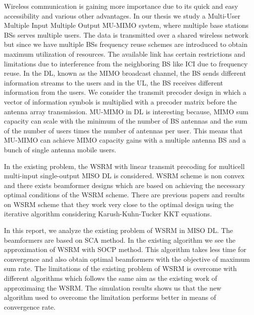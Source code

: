 Wireless communication is gaining more importance due to its quick and easy accessibility and various other advantages. In our thesis we study a Multi-User Multiple Input Multiple Output \ac{MU-MIMO} system, where multiple base stations \ac{BS}s serves multiple users. The data is transmitted over a shared wireless network but since we have multiple \ac{BS}s frequency reuse schemes are introduced to obtain maximum utilization of resources. The available link has certain restrictions and limitations due to interference from the neighboring \ac{BS} like \ac{ICI} due to frequency reuse. In the \ac{DL}, known as the \ac{MIMO} broadcast channel, the \ac{BS} sends different information streams to the users and in the \ac{UL}, the \ac{BS} receives different information from the users. We consider the transmit precoder design in which a vector of information symbols is multiplied with a precoder matrix before the antenna array transmission. \ac{MU-MIMO} in \ac{DL} is interesting because, \ac{MIMO} sum capacity can scale with the minimum of the number of \ac{BS} antennas and the sum of the number of users times the number of antennas per user. This means that \ac{MU-MIMO} can achieve \ac{MIMO} capacity gains with a multiple antenna \ac{BS} and a bunch of single antenna mobile users.

In the existing problem, the \ac{WSRM} with linear transmit precoding for multicell multi-input single-output \ac{MISO} \ac{DL} is considered. \ac{WSRM} scheme is non convex and there exists beamformer designs which are based on achieving the necessary optimal conditions of the \ac{WSRM} scheme. There are previous papers and results on \ac{WSRM} scheme that they work very close to the optimal design using the iterative algorithm considering Karush-Kuhn-Tucker \ac{KKT} equations. 

In this report, we analyze the existing problem of \ac{WSRM} in \ac{MISO} \ac{DL}. The beamformers are based on \ac{SCA} method. In the existing algorithm we see the approximation of \ac{WSRM} with \ac{SOCP} method. This algorithm takes less time for convergence and also obtain optimal beamformers with the objective of maximum sum rate. The limitations of the existing problem of \ac{WSRM} is overcome with different algorithms which follows the same aim as the existing work of approximaing the \ac{WSRM}. The simulation results shows us that the new algorithm used to overcome the limitation performs better in means of convergence rate.